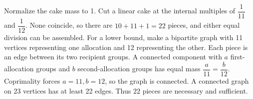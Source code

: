 Normalize the cake mass to 1. Cut a linear cake at the internal multiples of $\dfrac{1}{11}$ and $\dfrac{1}{12}$. None coincide, so there are $10+11+1=22$ pieces, and either equal division can be assembled. For a lower bound, make a bipartite graph with 11 vertices representing one allocation and 12 representing the other. Each piece is an edge between its two recipient groups. A connected component with $a$ first-allocation groups and $b$ second-allocation groups has equal mass $\dfrac{a}{11}=\dfrac{b}{12}$. Coprimality forces $a=11,b=12$, so the graph is connected. A connected graph on 23 vertices has at least 22 edges. Thus $\boxed{22}$ pieces are necessary and sufficient.
